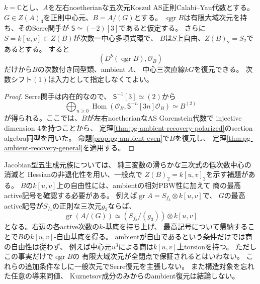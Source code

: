 \begin{corollary}[三次三様体の構造対象付き導来復元]
\label{cor:pg-ambient-derived-threefold}
$k=\mathbb C$とし、$A$を左右noetherianな五次元Koszul
AS正則Calabi--Yau代数とする。
$G\in Z(A)_3$を正則中心元、$B=A/(G)$とする。
$\operatorname{qgr}B$は有限大域次元を持ち、そのSerre関手が
$\mathsf S\simeq(-2)[3]$であると仮定する。
さらに$S=k[u,v]\subset Z(B)$が次数一中心多項式環で、
$B$は$S$上自由、$Z(B)_2=S_2$であるとする。
すると
\begin{equation}\label{eq:pg-ambient-derived-input}
 (D^b(\operatorname{qgr}B),\mathcal O_B)
\end{equation}
だけから$B$の次数付き同型類、ambient $A$、
中心三次直線$kG$を復元できる。
次数シフト$(1)$は入力として指定しなくてよい。
\end{corollary}
\begin{proof}
Serre関手は内在的なので、
$\mathsf S^{-1}[3]\simeq(2)$から
\begin{equation}\label{eq:pg-ambient-derived-Veronese}
 \bigoplus_{n\ge0}
 \operatorname{Hom}(\mathcal O_B,\mathsf S^{-n}[3n]\mathcal O_B)
 \simeq B^{(2)}
\end{equation}
が得られる。ここでは、$B$が左右noetherianなAS Gorenstein代数で
injective dimension $4$を持つことから、
定理\ref{thm:pg-ambient-recovery-polarized}のsection algebra同型を用いた。
命題\ref{prop:pg-ambient-even}で$B$を復元し、
定理\ref{thm:pg-ambient-recovery-general}を適用する。
\end{proof}

\begin{remark}[既存の三次三様体族と未解決部分]
Jacobian型五生成元族については、
純三変数の滑らかな三次式の低次数中心の消滅と
Hessianの非退化性を用い、一般点で
$Z(B)_2=k[u,v]_2$を示す補題がある。
$B$の$k[u,v]$上の自由性には、ambientの相対PBW性に加えて
商の最高active記号を確認する必要がある。
例えば$\operatorname{gr}A=S_{f_3}\otimes k[u,v]$で、
$G$の最高active記号が$S_{f_3}$の正則な三次元$g_3$ならば、
\begin{equation}\label{eq:pg-ambient-quotient-symbol}
 \operatorname{gr}(A/(G))\simeq(S_{f_3}/(g_3))\otimes k[u,v]
\end{equation}
となる。右辺の各active次数の$k$-基底を持ち上げ、
最高記号について帰納することで$B$の$k[u,v]$-自由基底を得る。
ambientが自由であるという条件だけでは商の自由性は従わず、
例えば中心元$u^3$による商は$k[u,v]$上torsionを持つ。
ただしこの事実だけで$\operatorname{qgr}B$の
有限大域次元が全閉点で保証されるとはいわない。
これらの追加条件なしに一般次元でSerre復元を主張しない。
また構造対象を忘れた任意の導来同値、
Kuznetsov成分のみからのambient復元は結論しない。
\end{remark}
